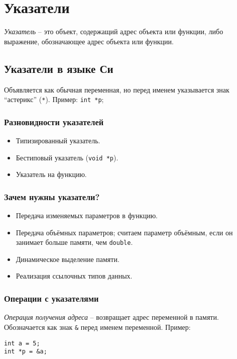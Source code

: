 \section{Указатели}

\begin{definition}
  \textit{Указатель} -- это объект, содержащий адрес объекта или функции, либо выражение, обозначающее адрес объекта или функции.
\end{definition}

\subsection{Указатели в языке Си}

Объявляется как обычная переменная, но перед именем указывается знак ``астерикс'' (\texttt{*}). Пример: \texttt{int *p};

\subsubsection{Разновидности указателей}

\begin{itemize}
  \item Типизированный указатель.
  \item Бестиповый указатель (\texttt{void *p}).
  \item Указатель на функцию.
\end{itemize}

\subsubsection{Зачем нужны указатели?}

\begin{itemize}
  \item Передача изменяемых параметров в функцию.
  \item Передача объёмных параметров; считаем параметр объёмным, если он занимает больше памяти, чем \texttt{double}.
  \item Динамическое выделение памяти.
  \item Реализация ссылочных типов данных.
\end{itemize}

\subsubsection{Операции с указателями}

\textit{Операция получения адреса} -- возвращает адрес переменной в памяти. Обозначается как знак \texttt{\&} перед именем переменной. Пример:
\begin{verbatim}
int a = 5;
int *p = &a;
\end{verbatim}

